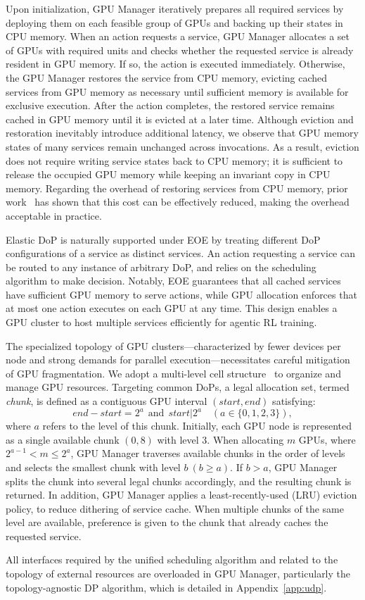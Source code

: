 Upon initialization, GPU Manager iteratively prepares all required services by deploying them on each feasible group of GPUs and backing up their states in CPU memory. When an action requests a service, GPU Manager allocates a set of GPUs with required units and checks whether the requested service is already resident in GPU memory. If so, the action is executed immediately.
Otherwise, the GPU Manager restores the service from CPU memory, evicting cached services from GPU memory as necessary until sufficient memory is available for exclusive execution. After the action completes, the restored service remains cached in GPU memory until it is evicted at a later time. 
Although eviction and restoration inevitably introduce additional latency, we observe that GPU memory states of many services remain unchanged across invocations. As a result, eviction does not require writing service states back to CPU memory; it is sufficient to release the occupied GPU memory while keeping an invariant copy in CPU memory.
Regarding the overhead of restoring services from CPU memory, prior work~\citep{zhang2025blitzscale,xiang2025aegaeon} has shown that this cost can be effectively reduced, making the overhead acceptable in practice.

Elastic DoP is naturally supported under EOE by treating different DoP configurations of a service as distinct services. An action requesting a service can be routed to any instance of arbitrary DoP, and relies on the scheduling algorithm to make decision.
Notably, EOE guarantees that all cached services have sufficient GPU memory to serve actions, while GPU allocation enforces that at most one action executes on each GPU at any time. This design enables a GPU cluster to host multiple services efficiently for agentic RL training.


The specialized topology of GPU clusters—characterized by fewer devices per node and strong demands for parallel execution—necessitates careful mitigation of GPU fragmentation.
We adopt a multi-level cell structure~\citep{zhao2020hived} to organize and manage GPU resources.
Targeting common DoPs, a legal allocation set, termed \emph{chunk}, is defined as a contiguous GPU interval $(start, end)$ satisfying:
$$
end - start = 2^a~~ \text{and}~~ start | 2^a\quad (a \in \{0,1,2,3\}),
$$
where $a$ refers to the level of this chunk.
Initially, each GPU node is represented as a single available chunk $(0, 8)$ with level 3. When allocating $m$ GPUs, where $2^{a-1} < m \le 2^a$, GPU Manager traverses available chunks in the order of levels and selects the smallest chunk with level $b~(b\ge a)$. If $b > a$, GPU Manager splits the chunk into several legal chunks accordingly, and the resulting chunk is returned.
In addition, GPU Manager applies a least-recently-used (LRU) eviction policy, to reduce dithering of service cache. When multiple chunks of the same level are available, preference is given to the chunk that already caches the requested service.

All interfaces required by the unified scheduling algorithm and related to the topology of external resources are overloaded in GPU Manager, particularly the topology-agnostic DP algorithm, which is detailed in Appendix~\ref{app:udp}.